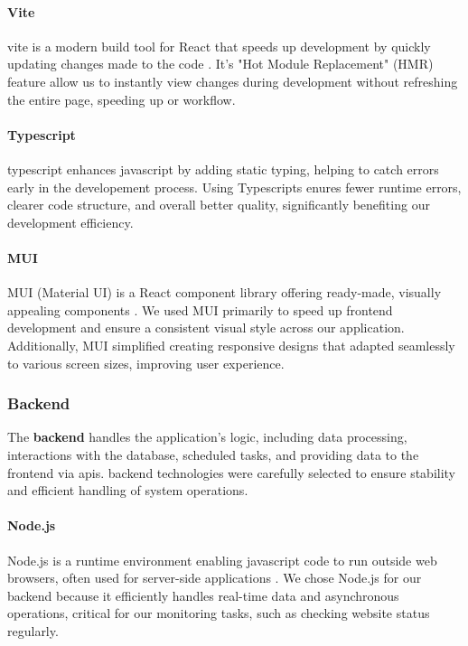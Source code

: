 \paragraph{Vite}
\gls{vite} is a modern build tool for React that speeds up development by quickly updating changes made to the code \autocite{viteGuide}. It's "Hot Module Replacement" (HMR) feature allow us to instantly view changes during development without refreshing the entire page, speeding up or workflow. 

\paragraph{Typescript}
{\gls{typescript}} enhances {\gls{javascript}} by adding static typing, helping to catch errors early in the developement process. Using Typescripts enures fewer runtime errors, clearer code structure, and overall better quality, significantly benefiting our development efficiency.

\paragraph{MUI}
MUI (Material UI) is a React component library offering ready-made, visually appealing components \autocite{Mui}. We used MUI primarily to speed up frontend development and ensure a consistent visual style across our application. Additionally, MUI simplified creating responsive designs that adapted seamlessly to various screen sizes, improving user experience.

\subsubsection{Backend}
The \textbf{\gls{backend}} handles the application's logic, including data processing, interactions with the database, scheduled tasks, and providing data to the \gls{frontend} via \acrshort{api}s. \gls{backend} technologies were carefully selected to ensure stability and efficient handling of system operations.

\paragraph{Node.js}
Node.js is a runtime environment enabling {\gls{javascript}} code to run outside web browsers, often used for server-side applications \autocite{node}. We chose Node.js for our \gls{backend} because it efficiently handles real-time data and asynchronous operations, critical for our monitoring tasks, such as checking website status regularly.


